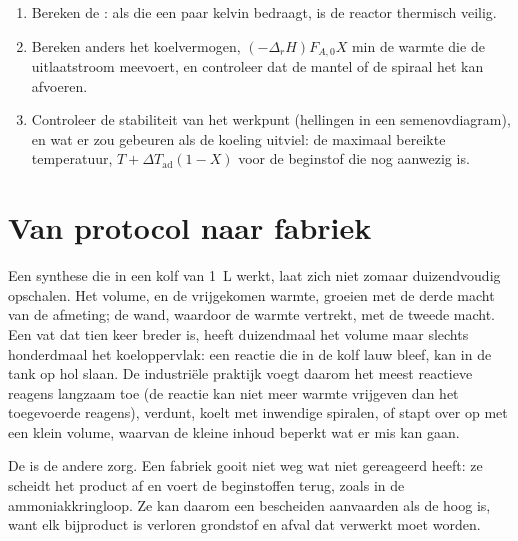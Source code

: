 \begin{method}\label{met:b2:continuous-reactors:heat-balance}
\begin{enumerate}
  \item Bereken de : als die een paar kelvin bedraagt, is de
        reactor thermisch veilig.
  \item Bereken anders het koelvermogen, $(-\Delta_r H)F_{A,0}X$ min de
        warmte die de uitlaatstroom meevoert, en controleer dat de mantel of de spiraal
        het kan afvoeren.
  \item Controleer de stabiliteit van het werkpunt (hellingen in een
        semenovdiagram), en wat er zou gebeuren als de koeling uitviel: de
        maximaal bereikte temperatuur, $T + \Delta T_{\text{ad}}(1 - X)$ voor
        de beginstof die nog aanwezig is.
\end{enumerate}
\end{method}

\section{Van protocol naar fabriek}

Een synthese die in een kolf van \qty{1}{L} werkt, laat zich niet zomaar duizendvoudig
opschalen. Het volume, en de vrijgekomen warmte, groeien met de derde macht van de
afmeting; de wand, waardoor de warmte vertrekt, met de tweede macht. Een vat dat tien
keer breder is, heeft duizendmaal het volume maar slechts honderdmaal het
koeloppervlak: een reactie die in de kolf lauw bleef, kan in de
tank op hol slaan. De industriële praktijk voegt daarom het meest reactieve reagens
langzaam toe (de reactie kan niet meer warmte vrijgeven dan het toegevoerde reagens), verdunt,
koelt met inwendige spiralen, of stapt over op  met een klein volume,
waarvan de kleine inhoud beperkt wat er mis kan gaan.

De  is de andere zorg. Een fabriek gooit niet weg wat niet
gereageerd heeft: ze scheidt het product af en voert de beginstoffen terug, zoals in de
ammoniakkringloop. Ze kan daarom een bescheiden  aanvaarden als de
 hoog is, want elk bijproduct is verloren grondstof en afval dat
verwerkt moet worden.


